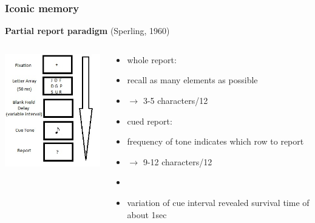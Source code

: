 \documentclass[]{beamer}
\begin{document}
\begin{frame}
 \frametitle{Iconic memory}
\begin{overlayarea}{120mm}{70mm}
 \textbf{ Partial report paradigm} (Sperling, 1960)
\begin{columns}[T]
 \begin{column}{30mm}
 \begin{center}
\includegraphics[width=50mm]{figs/l10/sperling_partial_report.jpg}
 \end{center}
 \end{column}

 \begin{column}{70mm}
\begin{itemize}
 \item[] whole report: 
 \item[] recall as many elements as possible 
 \item[] $\rightarrow$ 3-5 characters/12
 \item<2->[] cued report:
 \item<2->[] frequency of tone indicates which row to report
 \item<2->[] $\rightarrow$ 9-12 characters/12
 \item[]
 \item<3->[] variation of cue interval revealed survival time of about 1sec
\end{itemize}
 \end{column}
\end{columns}
\end{overlayarea}
\end{frame}
\end{document}
